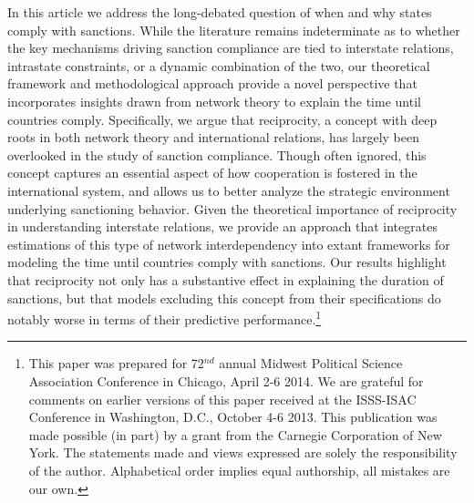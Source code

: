 In this article we address the long-debated question of when and why states comply with sanctions. While the literature remains indeterminate as to whether the key mechanisms driving sanction compliance are tied to interstate relations, intrastate constraints, or a dynamic combination of the two, our theoretical framework and methodological approach provide a novel perspective that incorporates insights drawn from network theory to explain the time until countries comply. Specifically, we argue that reciprocity, a concept with deep roots in both network theory and international relations, has largely been overlooked in the study of sanction compliance. Though often ignored, this concept captures an essential aspect of how cooperation is fostered in the international system, and allows us to better analyze the strategic environment underlying sanctioning behavior. Given the theoretical importance of reciprocity in understanding interstate relations, we provide an approach that integrates estimations of this type of network interdependency into extant frameworks for modeling the time until countries comply with sanctions. Our results highlight that reciprocity not only has a substantive effect in explaining the duration of sanctions, but that models excluding this concept from their specifications do notably worse in terms of their predictive performance.\footnote{This paper was prepared for 72$^{nd}$ annual Midwest Political Science Association Conference in Chicago, April 2-6 2014. We are grateful for comments on earlier versions of this paper received at the ISSS-ISAC Conference in Washington, D.C., October 4-6 2013. This publication was made possible (in part) by a grant from the Carnegie Corporation of New York. The statements made and views expressed are solely the responsibility of the author. Alphabetical order implies equal authorship, all mistakes are our own.}\\

